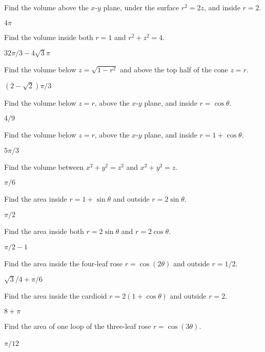 \begin{exercises}

\exercise Find the volume above the $x$-$y$ plane, under the surface
$r^2=2z$, and inside $r=2$.
\begin{answer} $4\pi$
\end{answer}

\exercise Find the volume inside both $r=1$ and $r^2+z^2=4$.
\begin{answer} $32\pi/3-4\sqrt3\pi$
\end{answer}

\exercise Find the volume below $z=\sqrt{1-r^2}$ and above
the top half of the cone $z=r$.
\begin{answer} $(2-\sqrt2)\pi/3$
\end{answer}

\exercise Find the volume below  $z=r$, above the $x$-$y$ plane, and
inside $r=\cos\theta$.
\begin{answer} $4/9$
\end{answer}

\exercise Find the volume below  $z=r$, above the $x$-$y$ plane, and
inside $r=1+\cos\theta$.
\begin{answer} $5\pi/3$
\end{answer}

\exercise Find the volume between $x^2+y^2=z^2$ and $x^2+y^2=z$.
\begin{answer} $\pi/6$
\end{answer}

\exercise Find the area inside $r=1+\sin\theta$ and outside
$r=2\sin\theta$. 
\begin{answer} $\pi/2$
\end{answer}

\exercise Find the area inside both
$r=2\sin\theta$ and $r=2\cos\theta$. 
\begin{answer} $\pi/2-1$
\end{answer}

\exercise Find the area inside the four-leaf rose $r=\cos(2\theta)$
and outside $r=1/2$.
\begin{answer} $\sqrt3/4+\pi/6$
\end{answer}

\exercise Find the area inside the cardioid $r=2(1+\cos\theta)$
and outside $r=2$.
\begin{answer} $8+\pi$
\end{answer}


\exercise  \relax\label{exer:area of three-leaf rose loop}
Find the area of one loop of the three-leaf rose
 $r=\cos(3\theta)$.
\begin{answer} $\pi/12$\
\end{answer}


\end{exercises}
